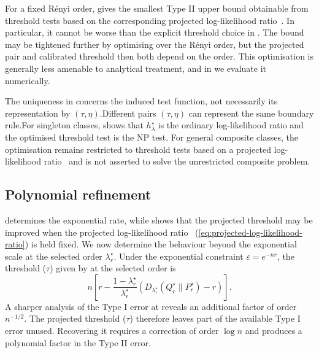 \documentclass[journal,10pt,draftclsnofoot,onecolumn]{IEEEtran}
\begin{document}
For a fixed R\'enyi order,  gives the smallest Type II upper bound obtainable from threshold tests based on the corresponding projected log-likelihood ratio~. In particular, it cannot be worse than the explicit threshold choice in . The bound may be tightened further by optimising over the R\'enyi order, but the projected pair and calibrated threshold then both depend on the order. This optimisation is generally less amenable to analytical treatment, and in  we evaluate it numerically.

The uniqueness in  concerns the induced test function, not necessarily its representation by $(\tau,\eta)$.Different pairs $(\tau,\eta)$ can represent the same boundary rule.For singleton classes,  shows that $h_\lambda^\star$ is the ordinary log-likelihood ratio and the optimised threshold test is the NP test. For general composite classes, the optimisation remains restricted to threshold tests based on a projected log-likelihood ratio~ and is not asserted to solve the unrestricted composite problem.

\subsection{Polynomial refinement}
\label{subsec:polynomial-refinement}

 determines the exponential rate, while  shows that the projected threshold may be improved when the projected log-likelihood ratio~ (\cref{eq:projected-log-likelihood-ratio}) is held fixed. We now determine the behaviour beyond the exponential scale at the selected order $\lambda_r^\star$. Under the exponential constraint $\varepsilon=e^{-nr}$, the threshold ($\tau$) given by  at the selected order is
\begin{equation*}
n\left[r-\frac{1-\lambda_r^\star}{\lambda_r^\star}\left(D_{\lambda_r^\star}(Q_r^\star\|P_r^\star)-r\right)\right].
\end{equation*}
A sharper analysis of the Type I error at  reveals an additional factor of order $n^{-1/2}$. The projected threshold ($\tau$) therefore leaves part of the available Type I error unused. Recovering it requires a correction of order $\log n$ and produces a polynomial factor in the Type II error.
\end{document}
